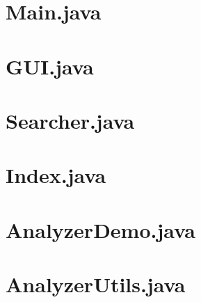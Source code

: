 \documentclass[12pt,a4paper,ngerman]{report}
\begin{document}
\begin{appendices}
\chapter{Main.java}

\chapter{GUI.java}

\chapter{Searcher.java}

\chapter{Index.java}

\chapter{AnalyzerDemo.java}

\chapter{AnalyzerUtils.java}

\end{appendices}
\end{document}
